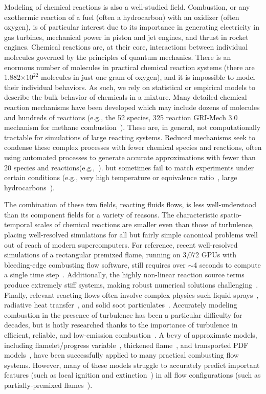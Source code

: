 Modeling of chemical reactions is also a well-studied field. Combustion, or any exothermic reaction of a fuel (often a hydrocarbon) with an oxidizer (often oxygen), is of particular interest due to its importance in generating electricity in gas turbines, mechanical power in piston and jet engines, and thrust in rocket engines. Chemical reactions are, at their core, interactions between individual molecules governed by the principles of quantum mechanics. There is an enormous number of molecules in practical chemical reaction systems (there are 1.882$\times 10^{22}$ molecules in just one gram of oxygen), and it is impossible to model their individual behaviors. As such, we rely on statistical or empirical models to describe the bulk behavior of chemicals in a mixture. Many detailed chemical reaction mechanisms have been developed which may include dozens of molecules and hundreds of reactions (e.g., the 52 species, 325 reaction GRI-Mech 3.0 mechanism for methane combustion~\cite{griMech}). These are, in general, not computationally tractable for simulations of large reacting systems. Reduced mechanisms seek to condense these complex processes with fewer chemical species and reactions, often using automated processes to generate accurate approximations with fewer than 20 species and reactions(e.g.,~\cite{Sung1998}). but sometimes fail to match experiments under certain conditions (e.g., very high temperature or equivalence ratio~\cite{Westbrook1984}, large hydrocarbons~\cite{Lu2008}).

The combination of these two fields, reacting fluids flows, is less well-understood than its component fields for a variety of reasons. The characteristic spatio-temporal scales of chemical reactions are smaller even than those of turbulence, placing well-resolved simulations for all but fairly simple canonical problems well out of reach of modern supercomputers. For reference, recent well-resolved simulations of a rectangular premixed flame, running on 3,072 GPUs with bleeding-edge combusting flow software, still requires over $\sim$4 seconds to compute a single time step~\cite{HenrydeFrahan2022}. Additionally, the highly non-linear reaction source terms produce extremely stiff systems, making robust numerical solutions challenging~\cite{SuoYang2017}. Finally, relevant reacting flows often involve complex physics such liquid sprays~\cite{Masri2016}, radiative heat transfer~\cite{radCombustion}, and solid soot particulates~\cite{Omidvarborna2015}. Accurately modeling combustion in the presence of turbulence has been a particular difficulty for decades, but is hotly researched thanks to the importance of turbulence in efficient, reliable, and low-emission combustion~\cite{peters2000}. A bevy of approximate models, including flamelet/progress variable~\cite{Pierce2001}, thickened flame~\cite{Colin2000}, and transported PDF models~\cite{Pope1985}, have been successfully applied to many practical combusting flow systems. However, many of these models struggle to accurately predict important features (such as local ignition and extinction~\cite{Jones2007}) in all flow configurations (such as partially-premixed flames~\cite{Knudsen2015}).

